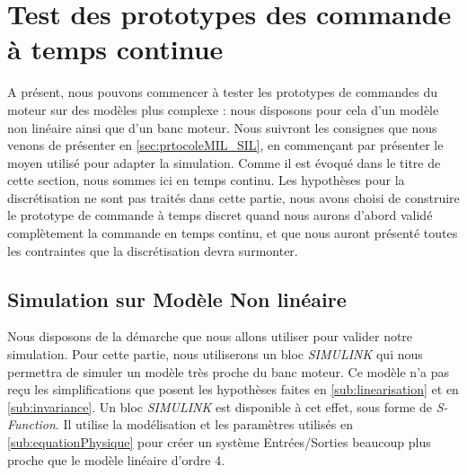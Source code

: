 \section{Test des prototypes des commande à temps continue}
	A présent, nous pouvons commencer à tester les prototypes de commandes du moteur sur des modèles plus complexe : nous disposons pour cela d'un modèle non linéaire ainsi que d'un banc moteur. Nous suivront les consignes que nous venons de présenter en \ref{sec:prtocoleMIL_SIL}, en commençant par présenter le moyen utilisé pour adapter la simulation. 
	Comme il est évoqué dans le titre de cette section, nous sommes ici en temps continu. Les hypothèses pour la discrétisation ne sont pas traités dans cette partie, nous avons choisi de construire le prototype de commande à temps discret quand nous aurons d'abord validé complètement la commande en temps continu, et que nous auront présenté toutes les contraintes que la discrétisation devra surmonter. %
	\subsection{Simulation sur Modèle Non linéaire}
		
		Nous disposons de la démarche que nous allons utiliser pour valider notre simulation. Pour cette partie, nous utiliserons un bloc \emph{SIMULINK} qui nous permettra de simuler un modèle très proche du banc moteur. Ce modèle n'a pas reçu les simplifications que posent les hypothèses faites en \ref{sub:linearisation} et en \ref{sub:invariance}. Un bloc \emph{SIMULINK} est disponible à cet effet, sous forme de \emph{S-Function}. Il utilise la modélisation et les paramètres utilisés en \ref{sub:equationPhysique} pour créer un système Entrées/Sorties beaucoup plus proche que le modèle linéaire d'ordre 4. 
